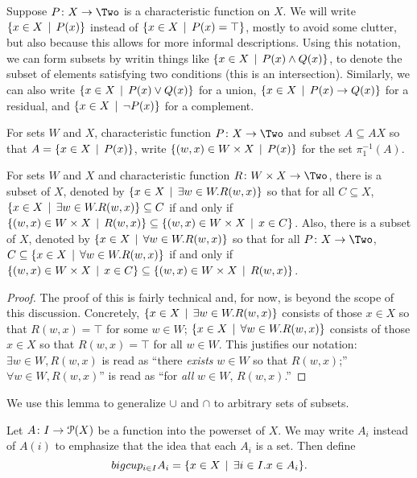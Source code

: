 Suppose $\fromto PX\Two$ is a characteristic function on $X$. We will write $\{x\in X\,\mid\, P(x)\}$ instead of $\{x\in X\,\mid\, P(x)=\top\}$, mostly to avoid some clutter, but also because this allows for more informal descriptions.
Using this notation, we can form subsets by writin things like $\{x\in X\,\mid\, P(x)\wedge Q(x)\}$, to denote the subset of elements satisfying two conditions (this is an intersection).
Similarly, we can also write $\{x\in X\,\mid\, P(x)\vee Q(x)\}$ for a union,
$\{x\in X\,\mid\, P(x)\to Q(x)\}$ for a residual, and $\{x\in X\,\mid\, \neg P(x)\}$ for a
complement.

\begin{defn}
	For sets $W$ and $X$, characteristic function $\fromto PX\Two$ and subset $A\subseteq AX$ so that $A = \{x\in X\,\mid\, P(x)\}$, 
	write $\{(w,x)\in W\times X\,\mid\, P(x)\}$ for the set $\pi_1^{-1}(A)$.
\end{defn}

\begin{lemma}
	For sets $W$ and $X$ and characteristic function $\fromto R{W\times X}\Two$,
	there is a subset of $X$, denoted by $\{x\in X\,\mid\, \exists w\in W.R(w,x)\}$ so that for all $C\subseteq X$,
	$\{x\in X\,\mid\, \exists w\in W.R(w,x)\} \subseteq C$ if and only if $\{(w,x)\in W\times X\,\mid\, R(w,x)\} \subseteq \{(w,x)\in W\times X\,\mid\, x\in C\}$.
	Also, there is a subset of $X$, denoted by $\{x\in X\,\mid\, \forall w\in W.R(w,x)\}$ so that for all $\fromto PX\Two$,
		$C \subseteq \{x\in X\,\mid\, \forall w\in W.R(w,x)\}$ if and only if $\{(w,x) \in W\times X\,\mid\, x\in C\}\subseteq \{(w,x)\in W\times X\,\mid\, R(w,x)\}$.
		
	\begin{proof}
		The proof of this is fairly technical and, for now, is beyond the scope of this discussion. Concretely, $\{x\in X\,\mid\, \exists w\in W.R(w,x)\}$ consists of those $x\in X$ so that $R(w,x) = \top$ for some $w\in W$; $\{x\in X\,\mid\, \forall w\in W.R(w,x)\}$ consists of those $x\in X$ so that $R(w,x)=\top$ for all $w\in W$. This justifies our notation: $\exists w\in W,R(w,x)$ is read as ``there \emph{exists} $w\in W$ so that $R(w,x)$;''
		$\forall w\in W, R(w,x)$'' is read as ``for \emph{all} $w\in W$, $R(w,x)$.''
	\end{proof}
\end{lemma}

We use this lemma to generalize $\cup$ and $\cap$ to arbitrary sets of subsets.

\begin{defn}
Let ${A}\colon{I}\to{{\mathcal{P}}(X)}$ be a function into the powerset of $X$.
We may write $A_i$ instead  of $A(i)$ to emphasize that the idea that each $A_i$ is
a set. 
Then define 
\[bigcup_{i\in I}A_i = \{x\in X\,\mid\, \exists i\in I.x\in A_i\}.\]
\end{defn}

